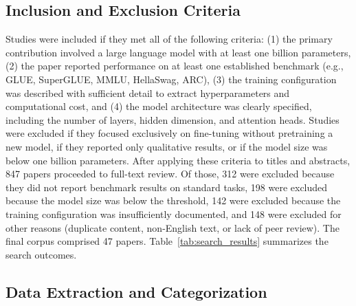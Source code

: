 \documentclass[journal]{IEEEtran}
\begin{document}
\subsection{Inclusion and Exclusion Criteria}

Studies were included if they met all of the following criteria: (1) the primary contribution involved a large language model with at least one billion parameters, (2) the paper reported performance on at least one established benchmark (e.g., GLUE, SuperGLUE, MMLU, HellaSwag, ARC), (3) the training configuration was described with sufficient detail to extract hyperparameters and computational cost, and (4) the model architecture was clearly specified, including the number of layers, hidden dimension, and attention heads. Studies were excluded if they focused exclusively on fine-tuning without pretraining a new model, if they reported only qualitative results, or if the model size was below one billion parameters. After applying these criteria to titles and abstracts, 847 papers proceeded to full-text review. Of those, 312 were excluded because they did not report benchmark results on standard tasks, 198 were excluded because the model size was below the threshold, 142 were excluded because the training configuration was insufficiently documented, and 148 were excluded for other reasons (duplicate content, non-English text, or lack of peer review). The final corpus comprised 47 papers. Table~\ref{tab:search_results} summarizes the search outcomes.

\begin{table}[htbp]
\centering
\caption{Summary of literature search results at each stage of the systematic review process.}
\label{tab:search_results}
\end{table}

\subsection{Data Extraction and Categorization}
\end{document}
